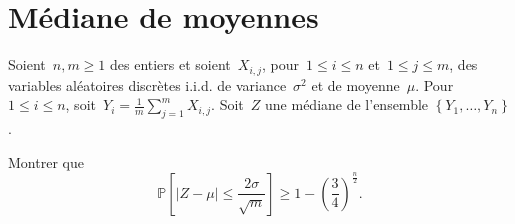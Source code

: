 \section{Médiane de moyennes}

Soient~$n, m \geq 1$ des entiers
et soient~$X_{i,j}$, pour~$1\leq i \leq n$ et~$1\leq j \leq m$, des variables aléatoires discrètes i.i.d. de variance~$\sigma^2$ et de moyenne~$\mu$.
Pour~$1\leq i \leq n$, soit~$Y_i = \frac{1}{m}\sum_{j=1}^m X_{i,j}$.
Soit~$Z$ une médiane  de l'ensemble $\left\{ Y_1,\dotsc,Y_n \right\}$.

Montrer que
\[ \mathbb{P} \left[ |Z-\mu| \leq \frac{2\sigma}{\sqrt{m}} \right] \geq 1 - \left( \frac 34 \right)^{\frac n2}. \]

